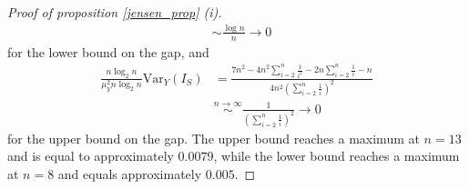 \begin{proof}[Proof of proposition \ref{jensen_prop} (i)]
\begin{align*}
    &\sim \frac{\log n}{n} \to 0
\end{align*}
for the lower bound on the gap, and
\begin{align*}
    \frac{n\log_2n}{\mu_Y^2n\log_2n}\text{Var}_Y(I_S) & = \frac{7n^2 - 4n^2\sum_{i=2}^n\frac{1}{i^2}-2n\sum_{i=2}^n\frac{1}{i}-n}{4n^2\left(\sum_{i=2}^n\frac{1}{i}\right)^2} \\
    & \stackrel{n\to\infty}{\sim} \frac{1}{\left(\sum_{i=2}^n\frac{1}{i}\right)^2} \to 0
\end{align*}
for the upper bound on the gap. The upper bound reaches a maximum at $n=13$ and is equal to approximately $0.0079$, while the lower bound reaches a maximum at $n=8$ and equals approximately $0.005$.
\end{proof}


